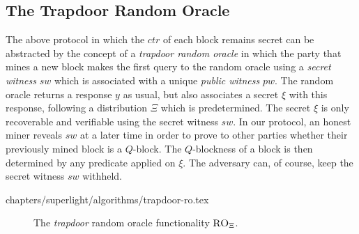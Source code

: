 \subsection{The Trapdoor Random Oracle}

The above protocol in which the $ctr$ of each block remains secret can be
abstracted by the concept of a \emph{trapdoor random oracle} in which the party
that mines a new block makes the first query to the random oracle using a
\emph{secret witness} $sw$ which is associated with a unique
\emph{public witness} $pw$. The random oracle returns a response $y$ as usual,
but also associates a secret $\xi$ with this response, following a distribution
$\Xi$ which is predetermined. The secret $\xi$ is only recoverable and
verifiable using the secret witness $sw$. In our protocol, an honest miner
reveals $sw$ at a later time in order to prove to other parties whether their
previously mined block is a $Q$-block. The $Q$-blockness of a block is then
determined by any predicate applied on $\xi$. The adversary can, of course, keep
the secret witness $sw$ withheld.

{chapters/superlight/algorithms/trapdoor-ro.tex}

\begin{figure}
\caption{
The \emph{trapdoor} random oracle functionality $\textsc{RO}_\Xi$.
\label{fig:trapdoor-ro}
}
\end{figure}

